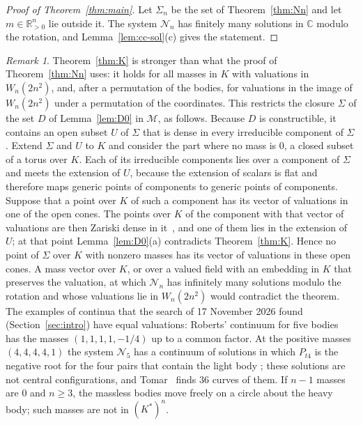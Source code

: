 \documentclass[11pt]{amsart}
\theoremstyle{definition}
\theoremstyle{remark}
\newtheorem{remark}[theorem]{Remark}
\numberwithin{equation}{section}
\newcommand{\CC}{\mathbb{C}}
\newcommand{\RR}{\mathbb{R}}
\newcommand{\cN}{\mathcal{N}}
\newcommand{\cM}{\mathcal{M}}
\begin{document}
\begin{proof}[Proof of Theorem~\ref{thm:main}]
Let $\Sigma_n$ be the set of Theorem~\ref{thm:Nn} and let $m \in \RR_{>0}^n$ lie outside it. The system
$\cN_n$ has finitely many solutions in $\CC$ modulo the rotation, and Lemma~\ref{lem:cc-sol}(c) gives the
statement.
\end{proof}

\begin{remark}\label{rem:roberts}
Theorem~\ref{thm:K} is stronger than what the proof of Theorem~\ref{thm:Nn} uses: it holds for all masses
in $K$ with valuations in $W_n(2n^2)$, and, after a permutation of the bodies, for valuations in the
image of $W_n(2n^2)$ under a permutation of the coordinates. This restricts the closure $\Sigma$ of the
set $D$ of Lemma~\ref{lem:D0} in $\cM$, as follows. Because $D$ is constructible, it contains an open
subset $U$ of $\Sigma$ that is dense in every irreducible component of $\Sigma$. Extend $\Sigma$ and
$U$ to $K$ and consider the part where no mass is $0$, a closed subset of a torus over $K$. Each of its
irreducible components lies over a component of $\Sigma$ and meets the extension of $U$, because the
extension of scalars is flat and therefore maps generic points of components to generic points of
components. Suppose that a
point over $K$ of such a component has its vector of valuations in one of the open cones. The points
over $K$ of the component with that vector of valuations are then Zariski dense in
it~\cite[Corollary~4.2, and Remark~2 of the erratum]{payne2009}, and one of them lies in the extension
of $U$; at that point Lemma~\ref{lem:D0}(a) contradicts Theorem~\ref{thm:K}. Hence no point of $\Sigma$
over $K$ with nonzero masses has its vector of valuations in these open cones. A mass vector over $K$, or
over a valued field with an embedding in $K$ that preserves the valuation, at which $\cN_n$ has infinitely
many solutions modulo the rotation and whose valuations lie in $W_n(2n^2)$ would contradict the theorem.
The examples of continua that the search of 17 November 2026 found (Section~\ref{sec:intro}) have
equal valuations: Roberts' continuum for five
bodies~\cite{roberts1999} has the masses $(1, 1, 1, 1, -1/4)$ up to a common factor. At the positive
masses $(4, 4, 4, 4, 1)$ the system $\cN_5$ has a continuum of solutions in which $P_{t4}$ is the
negative root for the four pairs that contain the light body
\cite[p.~543 and Remark~8]{albouykaloshin2012}; these solutions are not central configurations, and
Tomar~\cite{tomarspecial} finds 36 curves of them. If $n - 1$ masses are $0$ and $n \ge 3$, the
massless bodies move freely on a circle about the heavy body; such masses are not in $(K^{*})^n$.
\end{remark}
\end{document}
